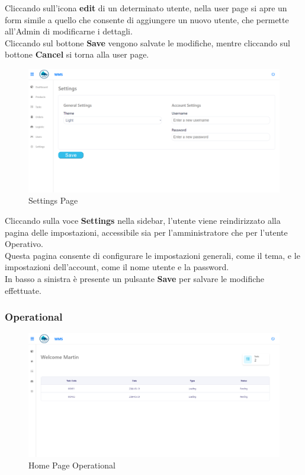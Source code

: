 Cliccando sull'icona \textbf{edit} di un determinato utente, nella user page si apre un form simile a quello che
consente di aggiungere un nuovo utente, che permette all'Admin di modificarne i dettagli.\\
Cliccando sul bottone \textbf{Save} vengono salvate le modifiche, mentre cliccando sul bottone \textbf{Cancel} si torna alla user page.

\begin{figure}[H]
    \centering
    \includegraphics[width=\textwidth]{document/sections/img/Storyboard/settingsPage.png}
    \caption{Settings Page}
    \label{fig:settingsPage}
\end{figure}

Cliccando sulla voce \textbf{Settings} nella sidebar, l’utente viene reindirizzato alla pagina delle impostazioni,
accessibile sia per l'amministratore che per l'utente Operativo.\\
Questa pagina consente di configurare le impostazioni generali, come il tema, e le impostazioni dell'account, come il nome utente e la password.\\
In basso a sinistra è presente un pulsante \textbf{Save} per salvare le modifiche effettuate.

\subsubsection{Operational}

\begin{figure}[H]
    \centering
    \includegraphics[width=\textwidth]{document/sections/img/Storyboard/homePageOp.png}
        \caption{Home Page Operational}
    \label{fig:homePageOp}
\end{figure}

